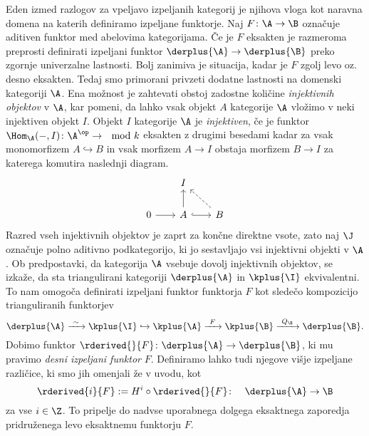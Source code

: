 Eden izmed razlogov za vpeljavo izpeljanih kategorij je njihova vloga kot naravna domena na katerih definiramo izpeljane funktorje. Naj $F \colon \A \to \B$ označuje aditiven funktor med abelovima kategorijama. Če je $F$ eksakten je razmeroma preprosti definirati izpeljani funktor $\derplus{\A} \to \derplus{\B}$ preko zgornje univerzalne lastnosti. Bolj zanimiva je situacija, kadar je $F$ zgolj levo oz. desno eksakten. Tedaj smo 
primorani privzeti dodatne lastnosti na domenski kategoriji $\A$. Ena možnost je zahtevati obstoj zadostne količine \emph{injektivnih objektov} v $\A$, kar pomeni, da lahko vsak objekt $A$ kategorije $\A$ vložimo v neki injektiven objekt $I$. Objekt $I$ kategorije $\A$ je \emph{injektiven}, če je funktor $\Hom_\A(-, I) \colon \A^\op \to \mod{k}$ eksakten \oz z drugimi besedami kadar za vsak monomorfizem $A \hookrightarrow B$ in vsak morfizem $A \to I$ obstaja morfizem $B \to I$ za katerega komutira naslednji diagram.
\[\begin{tikzcd}[column sep = 2em]
        & I \\
        0 & A & B
        \arrow[from=2-1, to=2-2]
        \arrow[from=2-2, to=1-2]
        \arrow[hook, from=2-2, to=2-3]
        \arrow[dashed, from=2-3, to=1-2]
    \end{tikzcd}\]
Razred vseh injektivnih objektov je zaprt za končne direktne vsote, zato naj $\J$ označuje polno aditivno podkategorijo, ki jo sestavljajo vsi injektivni objekti v $\A$. Ob predpostavki, da kategorija $\A$ vsebuje dovolj injektivnih objektov, se izkaže, da sta triangulirani kategoriji $\derplus{\A}$ in $\kplus{\I}$ ekvivalentni. To nam omogoča definirati izpeljani funktor funktorja $F$ kot sledečo kompozicijo trianguliranih funktorjev 
\[
    \derplus{\A} \xrightarrow{ \ \sim \ } \kplus{\I} \hookrightarrow \kplus{\A} \xrightarrow{\ F \ } \kplus{\B} \xrightarrow{\ Q_\B \ } \derplus{\B}.
\]
Dobimo funktor $\rderived{}{F} \colon \derplus{\A} \to \derplus{\B}$, ki mu pravimo \emph{desni izpeljani funktor} $F$. Definiramo lahko tudi njegove višje izpeljane različice, ki smo jih omenjali že v uvodu, kot
\[
    \rderived{i}{F} := H^i \circ \rderived{}{F} \colon \quad \derplus{\A} \to \B
\]
za vse $i \in \Z$. To pripelje do nadvse uporabnega dolgega eksaktnega zaporedja pridruženega levo eksaktnemu funktorju $F$.

